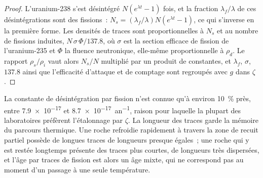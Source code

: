 \begin{proof}
L'uranium-238 s'est désintégré $N(e^{\lambda t} - 1)$ fois, et la fraction
$\lambda_f/\lambda$ de ces désintégrations sont des fissions~: $N_s =
(\lambda_f/\lambda)N(e^{\lambda t} - 1)$, ce qui s'inverse en la première forme.
Les densités de traces sont proportionnelles à $N_s$ et au nombre de fissions
induites, $N\,\sigma\,\Phi/137.8$, où $\sigma$ est la section efficace de
fission de l'uranium-235 et $\Phi$ la fluence neutronique, elle-même
proportionnelle à $\rho_d$. Le rapport $\rho_s/\rho_i$ vaut alors $N_s/N$ multiplié
par un produit de constantes, et $\lambda_f$, $\sigma$, $137.8$ ainsi que l'efficacité
d'attaque et de comptage sont regroupés avec $g$ dans $\zeta$.
\end{proof}

La constante de désintégration par fission n'est connue qu'à environ \qty{10}{\percent} près,
entre \num{7.9e-17} et \qty{8.7e-17}{an^{-1}}, raison pour laquelle la plupart des
laboratoires préfèrent l'étalonnage par $\zeta$. La longueur des traces garde
la mémoire du parcours thermique. Une roche refroidie rapidement à travers la
zone de recuit partiel possède de longues traces de longueurs presque égales~; une
roche qui y est restée longtemps présente des traces plus courtes, de longueurs très dispersées, et
l'âge par traces de fission est alors un âge mixte, qui ne correspond pas au moment
d'un passage à une seule température.

